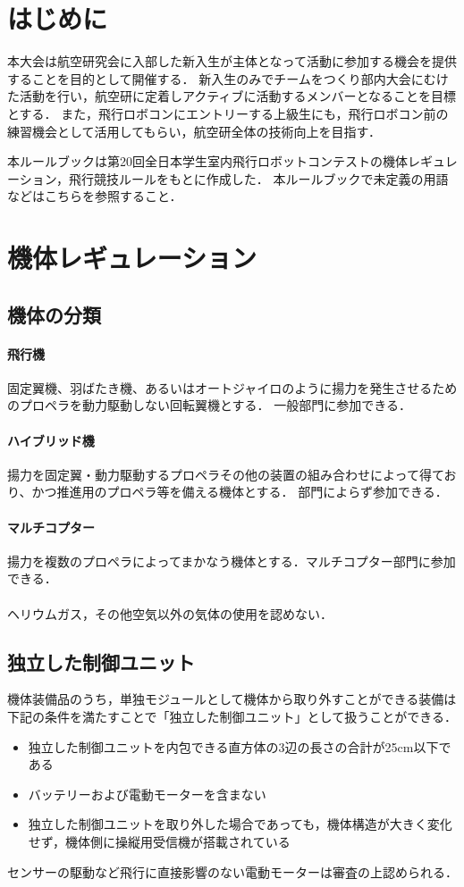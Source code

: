 \documentclass[a4paper,12pt,oneside]{jsarticle}
\begin{document}

\newpage
\tableofcontents
\newpage

\section{はじめに}
本大会は航空研究会に入部した新入生が主体となって活動に参加する機会を提供することを目的として開催する．
新入生のみでチームをつくり部内大会にむけた活動を行い，航空研に定着しアクティブに活動するメンバーとなることを目標とする．
また，飛行ロボコンにエントリーする上級生にも，飛行ロボコン前の練習機会として活用してもらい，航空研全体の技術向上を目指す．

本ルールブックは第20回全日本学生室内飛行ロボットコンテストの機体レギュレーション，飛行競技ルールをもとに作成した．
本ルールブックで未定義の用語などはこちらを参照すること．

\section{機体レギュレーション}
\subsection{機体の分類}
\paragraph{飛行機}
固定翼機、羽ばたき機、あるいはオートジャイロのように揚力を発生させるためのプロペラを動力駆動しない回転翼機とする．
一般部門に参加できる．
\paragraph{ハイブリッド機}
揚力を固定翼・動力駆動するプロペラその他の装置の組み合わせによって得ており、かつ推進用のプロペラ等を備える機体とする．
部門によらず参加できる．
\paragraph{マルチコプター}
揚力を複数のプロペラによってまかなう機体とする．マルチコプター部門に参加できる．

\paragraph{}ヘリウムガス，その他空気以外の気体の使用を認めない．

\subsection{独立した制御ユニット}
機体装備品のうち，単独モジュールとして機体から取り外すことができる装備は下記の条件を満たすことで「独立した制御ユニット」として扱うことができる．
\begin{itemize}
  \item 独立した制御ユニットを内包できる直方体の3辺の長さの合計が25cm以下である
  \item バッテリーおよび電動モーターを含まない
  \item 独立した制御ユニットを取り外した場合であっても，機体構造が大きく変化せず，機体側に操縦用受信機が搭載されている
\end{itemize}
センサーの駆動など飛行に直接影響のない電動モーターは審査の上認められる．
\end{document}
